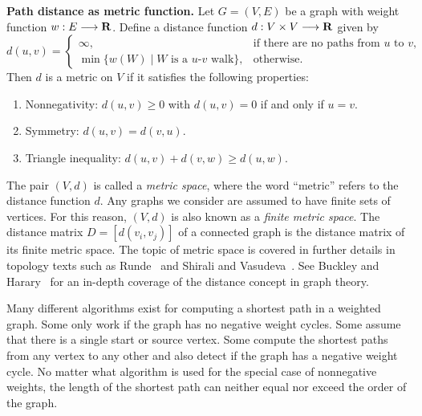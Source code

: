 \begin{lemma}
\label{lem:graph_algorithms:path_distance_metric_function}
\textbf{Path distance as metric function.}
Let $G = (V,E)$ be a graph with weight function
$w: E \longrightarrow \mathbf{R}$. Define a distance function
$d: V \times V \longrightarrow \mathbf{R}$ given by
\[
d(u,v)
=
\begin{cases}
\infty, & \text{if there are no paths from $u$ to $v$}, \\[4pt]
\min\{w(W) \;|\; \text{$W$ is a $u$-$v$ walk}\}, & \text{otherwise}.
\end{cases}
\]
Then $d$ is a metric on $V$ if it satisfies the
following properties:
\begin{enumerate}
\item Nonnegativity: $d(u,v) \geq 0$ with $d(u,v) = 0$ if and only if
  $u = v$.

\item Symmetry: $d(u,v) = d(v,u)$.

\item Triangle inequality:
  $d(u,v) + d(v,w) \geq d(u,w)$.
\end{enumerate}
\end{lemma}

The pair $(V, d)$ is called a \emph{metric space},
where the word ``metric'' refers to the distance
function $d$. Any graphs we consider are
assumed to have finite sets of vertices. For this reason, $(V,d)$ is
also known as a \emph{finite metric space}.
The distance matrix $D = [d(v_i, v_j)]$ of a
connected graph is the distance matrix of its finite metric
space. The topic of metric space is covered
in further details in topology texts such as
Runde~\cite{Runde2005} and
Shirali and
Vasudeva~\cite{ShiraliVasudeva2006}.
See Buckley and Harary~\cite{BuckleyHarary1990} for an in-depth
coverage of the distance concept in graph theory.

Many different algorithms exist for computing a shortest
path in a weighted graph. Some only work if the
graph has no negative weight cycles. Some assume that there is a
single start or source vertex. Some compute the shortest paths from
any vertex to any other and also detect if the graph has a negative
weight cycle. No matter what algorithm is used
for the special case of nonnegative weights,
the length of the shortest path can neither equal
nor exceed the order of the graph.

